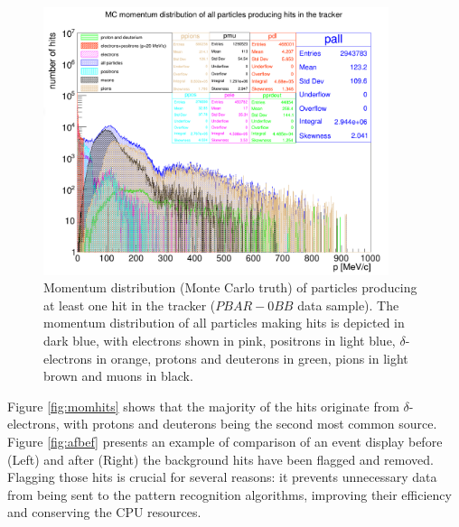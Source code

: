 \begin{figure}[!h]
    \centering
    \includegraphics[width =0.9\textwidth]{figures/png/Screenshot_20240815_124710.png}
\caption[Monte Carlo momentum distribution 
of particles producing hits in the Mu2e 
tracker ($PBAR-0BB$ data sample).]{
    Momentum distribution (Monte Carlo truth) 
    of particles producing at 
   least one hit in the tracker 
   ($PBAR-0BB$ data sample). 
   The momentum distribution 
   of all particles making hits is 
   depicted in dark blue, with electrons 
   shown in pink, positrons in light 
   blue, $\delta$-electrons in orange, protons 
   and deuterons in green, pions in 
   light brown and muons 
   in black. }
   \label{fig:pbar}
 \end{figure}


Figure \ref{fig:momhits} shows that 
the majority of the hits originate from $\delta$-electrons, 
with protons and deuterons being the second most 
common source. Figure \ref{fig:afbef} 
presents an example of comparison of an 
event display before (Left) and after (Right) the background 
hits have been flagged and removed.  
Flagging those hits is crucial for 
several reasons: it prevents unnecessary 
data from being sent to the pattern 
recognition algorithms, improving their efficiency and 
conserving the CPU resources.

